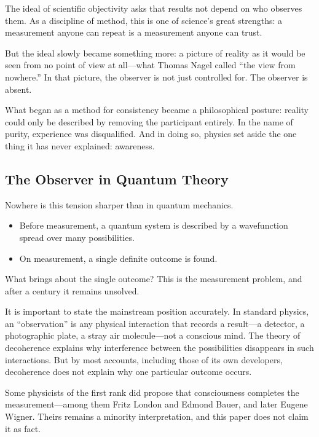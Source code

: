 \documentclass[11pt,a4paper]{article}
\begin{document}
The ideal of scientific objectivity asks that results not depend on who observes them. As a discipline of method, this is one of science's great strengths: a measurement anyone can repeat is a measurement anyone can trust.

But the ideal slowly became something more: a picture of reality as it would be seen from no point of view at all---what Thomas Nagel called ``the view from nowhere.'' In that picture, the observer is not just controlled for. The observer is absent.

What began as a method for consistency became a philosophical posture: reality could only be described by removing the participant entirely. In the name of purity, experience was disqualified. And in doing so, physics set aside the one thing it has never explained: awareness.

\subsection{The Observer in Quantum Theory}

Nowhere is this tension sharper than in quantum mechanics.

\begin{itemize}
  \item Before measurement, a quantum system is described by a wavefunction spread over many possibilities.
  \item On measurement, a single definite outcome is found.
\end{itemize}

What brings about the single outcome? This is the measurement problem, and after a century it remains unsolved.

It is important to state the mainstream position accurately. In standard physics, an ``observation'' is any physical interaction that records a result---a detector, a photographic plate, a stray air molecule---not a conscious mind. The theory of decoherence explains why interference between the possibilities disappears in such interactions. But by most accounts, including those of its own developers, decoherence does not explain why one particular outcome occurs.

Some physicists of the first rank did propose that consciousness completes the measurement---among them Fritz London and Edmond Bauer, and later Eugene Wigner. Theirs remains a minority interpretation, and this paper does not claim it as fact.
\end{document}
